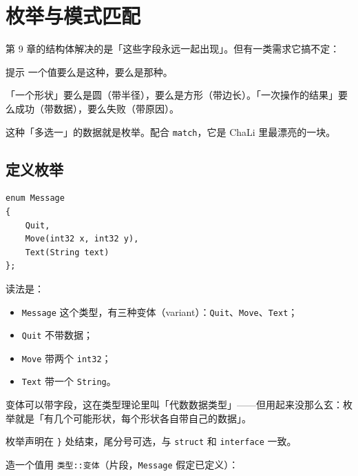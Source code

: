\chapter{枚举与模式匹配}
\label{ch:10}

第 9 章的结构体解决的是「这些字段永远一起出现」。但有一类需求它搞不定：

\begin{tip}{提示}
一个值要么是这种，要么是那种。
\end{tip}

「一个形状」要么是圆（带半径），要么是方形（带边长）。「一次操作的结果」要么成功（带数据），要么失败（带原因）。

这种「多选一」的数据就是枚举。配合 \texttt{match}，它是 ChaLi 里最漂亮的一块。

\section{定义枚举}

\par
\medskip
\begin{lstlisting}[style=chali]
enum Message
{
    Quit,
    Move(int32 x, int32 y),
    Text(String text)
};
\end{lstlisting}
\par
\medskip

读法是：

\begin{itemize}

\item \texttt{Message} 这个类型，有三种变体（variant）：\texttt{Quit}、\texttt{Move}、\texttt{Text}；

\item \texttt{Quit} 不带数据；

\item \texttt{Move} 带两个 \texttt{int32}；

\item \texttt{Text} 带一个 \texttt{String}。

\end{itemize}

变体可以带字段，这在类型理论里叫「代数数据类型」——但用起来没那么玄：枚举就是「有几个可能形状，每个形状各自带自己的数据」。

枚举声明在 \texttt{\}} 处结束，尾分号可选，与 \texttt{struct} 和 \texttt{interface} 一致。

造一个值用 \texttt{类型:\allowbreak{}:\allowbreak{}变体}（片段，\texttt{Message} 假定已定义）：

